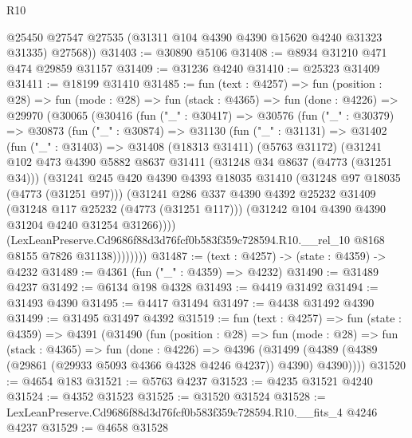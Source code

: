 \begin{lexlean}{R10}
\begin{coremodule}
        @25450
        @27547
        @27535
        (@31311 @104 @4390 @4390 @15620 @4240 @31323 @31335)
        @27568))
@31403 := @30890 @5106
@31408 := @8934 @31210 @471 @474 @29859 @31157
@31409 := @31236 @4240
@31410 := @25323 @31409
@31411 := @18199 @31410
@31485 := fun (text : @4257) =>
  fun (position : @28) =>
  fun (mode : @28) =>
  fun (stack : @4365) =>
  fun (done : @4226) =>
  @29970
    (@30065
      (@30416
        (fun ("_" : @30417) =>
        @30576
          (fun ("_" : @30379) =>
          @30873
            (fun ("_" : @30874) =>
            @31130
              (fun ("_" : @31131) =>
              @31402
                (fun ("_" : @31403) =>
                @31408
                  (@18313 @31411)
                  (@5763 @31172)
                  (@31241
                    @102
                    @473
                    @4390
                    @5882
                    @8637
                    @31411
                    (@31248 @34 @8637 (@4773 (@31251 @34)))
                    (@31241
                      @245
                      @420
                      @4390
                      @4393
                      @18035
                      @31410
                      (@31248 @97 @18035 (@4773 (@31251 @97)))
                      (@31241
                        @286
                        @337
                        @4390
                        @4392
                        @25232
                        @31409
                        (@31248 @117 @25232 (@4773 (@31251 @117)))
                        (@31242 @104 @4390 @4390 @31204 @4240 @31254 @31266))))
                  (LexLeanPreserve.Cd9686f88d3d76fcf0b583f359c728594.R10.__rel_10
                    @8168
                    @8155
                    @7826
                    @31138))))))))
@31487 := (text : @4257) -> (state : @4359) -> @4232
@31489 := @4361 (fun ("_" : @4359) => @4232)
@31490 := @31489 @4237
@31492 := @6134 @198 @4328
@31493 := @4419 @31492
@31494 := @31493 @4390
@31495 := @4417 @31494
@31497 := @4438 @31492 @4390
@31499 := @31495 @31497 @4392
@31519 := fun (text : @4257) =>
  fun (state : @4359) =>
  @4391
    (@31490
      (fun (position : @28) =>
      fun (mode : @28) =>
      fun (stack : @4365) =>
      fun (done : @4226) =>
      @4396 (@31499 (@4389 (@4389 (@29861 (@29933 @5093 @4366 @4328 @4246 @4237)) @4390) @4390))))
@31520 := @4654 @183
@31521 := @5763 @4237
@31523 := @4235 @31521 @4240
@31524 := @4352 @31523
@31525 := @31520 @31524
@31528 := LexLeanPreserve.Cd9686f88d3d76fcf0b583f359c728594.R10.__fits_4 @4246 @4237
@31529 := @4658 @31528

\end{coremodule}
\end{lexlean}
